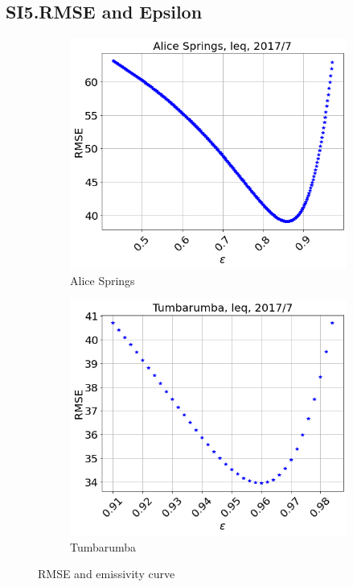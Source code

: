 \documentclass[fleqn,10pt]{wlscirep}
\begin{document}
\subsection*{SI5.RMSE and Epsilon}
\label{Subsection:RMSE}
\begin{figure}[h!]
\centering
\begin{subfigure}{.5\textwidth}
  \centering
  \includegraphics[width=.95\linewidth]{AS_RMSE_2018}
  \caption{Alice Springs}
  
\end{subfigure}%
\begin{subfigure}{.5\textwidth}
  \centering
  \includegraphics[width=.95\linewidth]{tum_RMSE_2017}
  \caption{Tumbarumba}
\end{subfigure}
\setlength{\belowcaptionskip}{-3ex}
\caption{RMSE and emissivity curve}
\label{fig:rmse_eps}
\end{figure}
\end{document}
